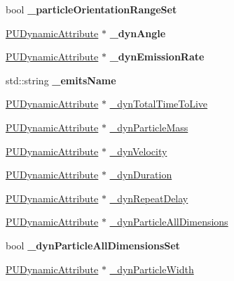 \begin{DoxyCompactItemize}
\mbox{\label{classPUEmitter_ada432d8ed18d8245774db0c0c6acf795}} 
bool {\bfseries \+\_\+particle\+Orientation\+Range\+Set}
\item 
\mbox{\label{classPUEmitter_a4168aa43669ec37c4445c64d39866902}} 
\hyperlink{classPUDynamicAttribute}{P\+U\+Dynamic\+Attribute} $\ast$ {\bfseries \+\_\+dyn\+Angle}
\item 
\mbox{\label{classPUEmitter_a1d84e9a75c6d2954835055ededaaa767}} 
\hyperlink{classPUDynamicAttribute}{P\+U\+Dynamic\+Attribute} $\ast$ {\bfseries \+\_\+dyn\+Emission\+Rate}
\item 
\mbox{\label{classPUEmitter_aa057dcb614461c8c06ae0d2da00d8562}} 
std\+::string {\bfseries \+\_\+emits\+Name}
\item 
\hyperlink{classPUDynamicAttribute}{P\+U\+Dynamic\+Attribute} $\ast$ \hyperlink{classPUEmitter_af374b7e83baedd42ad0f70f9b31fe9c1}{\+\_\+dyn\+Total\+Time\+To\+Live}
\item 
\hyperlink{classPUDynamicAttribute}{P\+U\+Dynamic\+Attribute} $\ast$ \hyperlink{classPUEmitter_a7de6c52d69bf9230b85ba825f6747944}{\+\_\+dyn\+Particle\+Mass}
\item 
\hyperlink{classPUDynamicAttribute}{P\+U\+Dynamic\+Attribute} $\ast$ \hyperlink{classPUEmitter_a999b98981c28389ef7090a07231b6c56}{\+\_\+dyn\+Velocity}
\item 
\hyperlink{classPUDynamicAttribute}{P\+U\+Dynamic\+Attribute} $\ast$ \hyperlink{classPUEmitter_adb41d33a1e421967b30ed75d57512bbb}{\+\_\+dyn\+Duration}
\item 
\hyperlink{classPUDynamicAttribute}{P\+U\+Dynamic\+Attribute} $\ast$ \hyperlink{classPUEmitter_a3932e1e7092421222aaa6fc0cda8161b}{\+\_\+dyn\+Repeat\+Delay}
\item 
\hyperlink{classPUDynamicAttribute}{P\+U\+Dynamic\+Attribute} $\ast$ \hyperlink{classPUEmitter_aabd10ff89b173636ebe0be3e065f260e}{\+\_\+dyn\+Particle\+All\+Dimensions}
\item 
\mbox{\label{classPUEmitter_a6e04f029d2fd96c38a919dd43b6296be}} 
bool {\bfseries \+\_\+dyn\+Particle\+All\+Dimensions\+Set}
\item 
\hyperlink{classPUDynamicAttribute}{P\+U\+Dynamic\+Attribute} $\ast$ \hyperlink{classPUEmitter_adf042602104b679a03288cf78c2d0422}{\+\_\+dyn\+Particle\+Width}

\end{DoxyCompactItemize}
